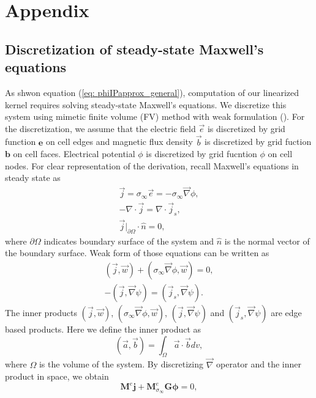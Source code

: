 \documentclass[a4paper, 11pt]{article}
\renewcommand{\div}{\nabla\cdot}
\newcommand{\grad}{\vec \nabla}
\newcommand{\siginf}{\sigma_\infty}
\newcommand{\dgrad}{{\mathbf G}}
\newcommand{\M}{{\mathbf M}}
\newcommand{\MeSigInf}{{\M^e_{\sigma_\infty}}}
\newcommand{\Me}{{\M^e}}
\renewcommand {\j}  { {\vec j} }
\renewcommand {\b}  { {\vec b} }
\newcommand {\e}  { {\vec e} }
\renewcommand {\dj}  { {\mathbf{j} } }
\newcommand {\db}  { {\mathbf{b} } }
\newcommand {\de}  { {\mathbf{e} } }
\begin{document}

\section{Appendix}
\subsection{Discretization of steady-state Maxwell's equations}
\label{section:maxwell_discrete}
As shwon equation (\ref{eq: phiIPapprox_general}), computation of our linearized kernel requires solving steady-state Maxwell's equations. 
We discretize this system using mimetic finite volume (FV) method with weak formulation (\cite{Eldadbook}). 
For the discretization, we assume that the electric field $\e$ is discretized by grid function $\de$ on cell edges and magnetic flux density $\b$ is discretized by grid fuction $\db$ on cell faces. 
Electrical potential $\phi$ is discretized by grid fucntion  $\phi$ on cell nodes. For clear representation of the derivation, recall Maxwell's equations in steady state as
\begin{align}
  \j = \siginf\e = -\siginf\grad \phi, \\
  -\div \j = \div \j_s, \\
  \j\big|_{\partial \Omega}\cdot\hat{n} = 0,
  \label{eq:DCBCneumann}
\end{align}
where $\partial \Omega$ indicates boundary surface of the system and $\hat{n}$ is the normal vector of the boundary surface. Weak form of those equations can be written as
\begin{align}
  (\j, \vec{w}) + (\siginf \grad \phi, \vec{w}) = 0, \\
  -(\j, \grad \psi) = (\j_s, \grad \psi).
\end{align}
The inner products $(\j, \vec{w})$, $(\siginf \grad \phi, \vec{w})$,  $(\j, \grad \psi)$ and $(\j_s, \grad \psi)$ are edge based products. Here we define the inner product as
\begin{equation}
  (\vec{a}, \vec{b}) = \int_{\Omega} \vec{a}\cdot\vec{b} dv,
\end{equation}
where $\Omega$ is the volume of the system. By discretizing $\grad$ operator and the inner product in space, we obtain
\begin{equation}
  \Me\dj + \MeSigInf\dgrad\boldsymbol{\phi} = 0,
  \label{eq:DCdisceq1}
\end{equation}
\end{document}
